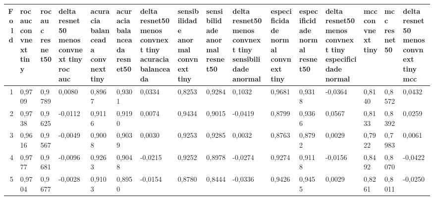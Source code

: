 \begin{tabular}{rlllllllllllllll}
\toprule
Fold & roc auc convnext tiny & roc auc resnet50 & delta resnet50 menos convnext tiny roc auc & acuracia balanceada convnext tiny & acuracia balanceada resnet50 & delta resnet50 menos convnext tiny acuracia balanceada & sensibilidade anormal convnext tiny & sensibilidade anormal resnet50 & delta resnet50 menos convnext tiny sensibilidade anormal & especificidade normal convnext tiny & especificidade normal resnet50 & delta resnet50 menos convnext tiny especificidade normal & mcc convnext tiny & mcc resnet50 & delta resnet50 menos convnext tiny mcc \\
\midrule
1 & 0,9709 & 0,9789 & 0,0080 & 0,8967 & 0,9301 & 0,0334 & 0,8253 & 0,9284 & 0,1032 & 0,9681 & 0,9318 & -0,0364 & 0,8140 & 0,8572 & 0,0432 \\
2 & 0,9738 & 0,9625 & -0,0112 & 0,9116 & 0,9190 & 0,0074 & 0,9434 & 0,9015 & -0,0419 & 0,8799 & 0,9366 & 0,0567 & 0,8133 & 0,8392 & 0,0259 \\
3 & 0,9616 & 0,9567 & -0,0049 & 0,9008 & 0,9039 & 0,0030 & 0,9253 & 0,9285 & 0,0032 & 0,8763 & 0,8792 & 0,0029 & 0,7922 & 0,7983 & 0,0061 \\
4 & 0,9777 & 0,9681 & -0,0096 & 0,9263 & 0,9048 & -0,0215 & 0,9252 & 0,8978 & -0,0274 & 0,9274 & 0,9118 & -0,0156 & 0,8492 & 0,8070 & -0,0422 \\
5 & 0,9704 & 0,9677 & -0,0028 & 0,9103 & 0,8950 & -0,0154 & 0,8780 & 0,8444 & -0,0336 & 0,9426 & 0,9455 & 0,0029 & 0,8261 & 0,8011 & -0,0250 \\
\bottomrule
\end{tabular}
